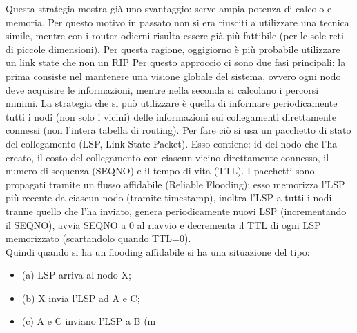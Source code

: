 Questa strategia mostra già uno svantaggio: serve ampia potenza di calcolo e memoria. Per questo motivo in passato non si era riusciti a utilizzare una tecnica simile, mentre con i router odierni risulta essere già più fattibile (per le sole reti di piccole dimensioni). Per questa ragione, oggigiorno è più probabile utilizzare un link state che non un RIP Per questo approccio ci sono due fasi principali: la prima consiste nel mantenere una visione globale del sistema, ovvero ogni nodo deve acquisire le informazioni, mentre nella seconda si calcolano i percorsi minimi. La strategia che si può utilizzare è quella di informare periodicamente tutti i nodi (non solo i vicini) delle informazioni sui collegamenti direttamente connessi (non l’intera tabella di routing). Per fare ciò si usa un pacchetto di stato del collegamento (LSP, Link State Packet). Esso contiene: id del nodo che l’ha creato, il costo del collegamento con ciascun vicino direttamente connesso, il numero di sequenza (SEQNO) e il tempo di vita (TTL). I pacchetti sono propagati tramite un flusso affidabile (Reliable Flooding): esso memorizza l’LSP più recente da ciascun nodo (tramite timestamp), inoltra l’LSP a tutti i nodi tranne quello che l’ha inviato, genera periodicamente nuovi LSP (incrementando il SEQNO), avvia SEQNO a 0 al riavvio e decrementa il TTL di ogni LSP memorizzato (scartandolo quando TTL=0). \\
Quindi quando si ha un flooding affidabile si ha una situazione del tipo:
\begin{itemize}
  \item(a) LSP arriva al nodo X;
  \item (b) X invia l’LSP ad A e C;
  \item (c) A e C inviano l’LSP a B (m
\end{itemize}
